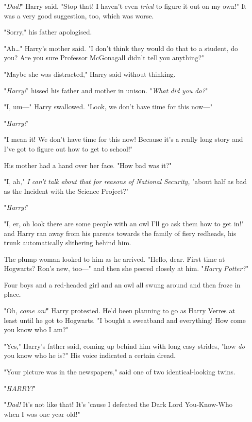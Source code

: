 "\emph{Dad!}" Harry said. "Stop that! I haven't even \emph{tried} to figure it 
out on my own!" It was a very good suggestion, too, which was worse.

"Sorry," his father apologised.

"Ah{\ldots}" Harry's mother said. "I don't think they would do that to a 
student, do you? Are you sure Professor McGonagall didn't tell you anything?"

"Maybe she was distracted," Harry said without thinking.

"\emph{Harry!}" hissed his father and mother in unison. "\emph{What did you 
do?}"

"I, um---" Harry swallowed. "Look, we don't have time for this now---"

"\emph{Harry!}"

"I mean it! We don't have time for this now! Because it's a really long story 
and I've got to figure out how to get to school!"

His mother had a hand over her face. "How bad was it?"

"I, ah," \emph{I can't talk about that for reasons of National Security,} 
"about half as bad as the Incident with the Science Project?"

"\emph{Harry!}"

"I, er, oh look there are some people with an owl I'll go ask them how to get 
in!" and Harry ran away from his parents towards the family of fiery redheads, 
his trunk automatically slithering behind him.

The plump woman looked to him as he arrived. "Hello, dear. First time at 
Hogwarts? Ron's new, too---" and then she peered closely at him. "\emph{Harry 
Potter?}"

Four boys and a red-headed girl and an owl all swung around and then froze in 
place.

"Oh, \emph{come on!}" Harry protested. He'd been planning to go as Harry Verres 
at least until he got to Hogwarts. "I bought a sweatband and everything! How 
come you know who I am?"

"Yes," Harry's father said, coming up behind him with long easy strides, "how 
\emph{do} you know who he is?" His voice indicated a certain dread.

"Your picture was in the newspapers," said one of two identical-looking twins.

"\emph{HARRY!}"

"\emph{Dad!} It's not like that! It's 'cause I defeated the Dark Lord 
You-Know-Who when I was one year old!"

